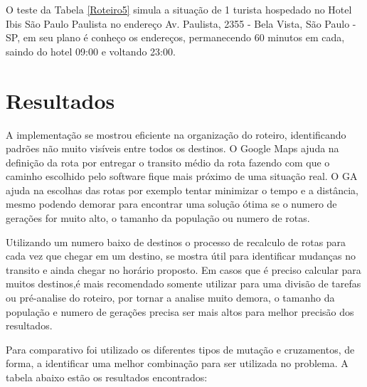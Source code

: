 O teste da Tabela \ref{Roteiro5} simula a situação de 1 turista hospedado no Hotel Ibis São Paulo Paulista no endereço Av. Paulista, 2355 - Bela Vista, São Paulo - SP, em seu plano é conheço os endereços, permanecendo 60 minutos em cada, saindo do hotel 09:00 e voltando 23:00.

\section{Resultados}

A implementação se mostrou eficiente na organização do roteiro, identificando padrões não muito visíveis entre todos os destinos. O Google Maps ajuda na definição da rota por entregar o transito médio da rota fazendo com que o caminho escolhido pelo software fique mais próximo de uma situação real. O GA ajuda na escolhas das rotas por exemplo tentar minimizar o tempo e a distância, mesmo podendo demorar para encontrar uma solução ótima se o numero de gerações for muito alto, o tamanho da população ou numero de rotas. 

Utilizando um numero baixo de destinos o processo de recalculo de rotas para cada vez que chegar em um  destino, se mostra útil para identificar mudanças no transito e ainda chegar no horário proposto. Em casos que é preciso calcular para muitos destinos,é mais recomendado somente utilizar para uma divisão de tarefas ou pré-analise do roteiro, por tornar a analise muito demora, o tamanho da população e numero de gerações precisa ser mais altos para melhor precisão dos resultados.

Para comparativo foi utilizado os diferentes tipos de mutação e cruzamentos, de forma, a identificar uma melhor combinação para ser utilizada no problema. A tabela abaixo estão os resultados encontrados:

